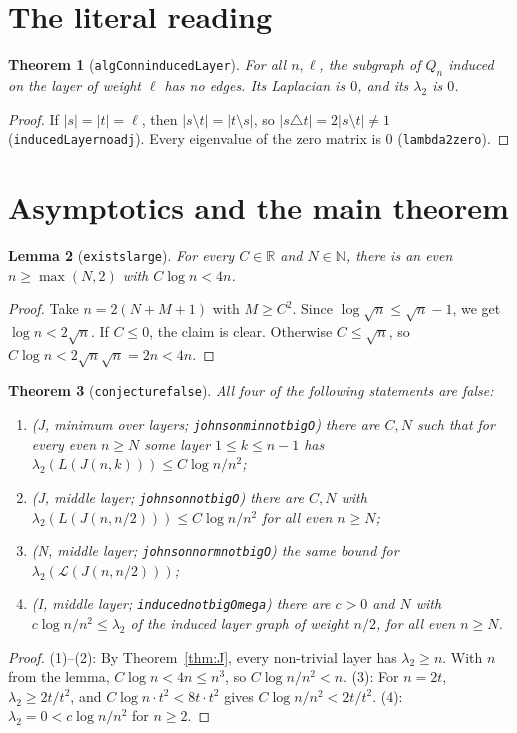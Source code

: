 \documentclass[11pt]{article}
\newtheorem{theorem}{Theorem}
\newtheorem{lemma}[theorem]{Lemma}
\theoremstyle{definition}
\theoremstyle{remark}
\renewcommand{\_}{\oldus\allowbreak}
\begin{document}
\section{The literal reading}

\begin{theorem}[\texttt{algConn\_inducedLayer}]
For all $n,\ell$, the subgraph of $Q_n$ induced on the layer of weight $\ell$ has no edges. Its Laplacian
is $0$, and its $\lambda_2$ is $0$.
\end{theorem}
\begin{proof}
If $|s|=|t|=\ell$, then $|s\setminus t|=|t\setminus s|$, so $|s\triangle t|=2|s\setminus t|\ne1$
(\texttt{inducedLayer\_no\_adj}). Every eigenvalue of the zero matrix is $0$ (\texttt{lambda2\_zero}).
\end{proof}

\section{Asymptotics and the main theorem}

\begin{lemma}[\texttt{exists\_large}]
For every $C\in\mathbb R$ and $N\in\mathbb N$, there is an even $n\ge\max(N,2)$ with $C\log n<4n$.
\end{lemma}
\begin{proof}
Take $n=2(N+M+1)$ with $M\ge C^2$. Since $\log\sqrt n\le\sqrt n-1$, we get $\log n<2\sqrt n$. If
$C\le0$, the claim is clear. Otherwise $C\le\sqrt n$, so $C\log n<2\sqrt n\sqrt n=2n<4n$.
\end{proof}

\begin{theorem}[\texttt{conjecture\_3963\_false}]
All four of the following statements are false:
\begin{enumerate}[leftmargin=*]
\item (J, minimum over layers; \texttt{johnson\_min\_not\_bigO}) there are $C,N$ such that for every even
  $n\ge N$ some layer $1\le k\le n-1$ has $\lambda_2(L(J(n,k)))\le C\log n/n^2$;
\item (J, middle layer; \texttt{johnson\_not\_bigO}) there are $C,N$ with
  $\lambda_2(L(J(n,n/2)))\le C\log n/n^2$ for all even $n\ge N$;
\item (N, middle layer; \texttt{johnson\_norm\_not\_bigO}) the same bound for $\lambda_2(\mathcal L(J(n,n/2)))$;
\item (I, middle layer; \texttt{induced\_not\_bigOmega}) there are $c>0$ and $N$ with
  $c\log n/n^2\le\lambda_2$ of the induced layer graph of weight $n/2$, for all even $n\ge N$.
\end{enumerate}
\end{theorem}
\begin{proof}
(1)--(2): By Theorem~\ref{thm:J}, every non-trivial layer has $\lambda_2\ge n$. With $n$ from the lemma,
$C\log n<4n\le n^3$, so $C\log n/n^2<n$. (3): For $n=2t$, $\lambda_2\ge 2t/t^2$, and
$C\log n\cdot t^2<8t\cdot t^2$ gives $C\log n/n^2<2t/t^2$. (4): $\lambda_2=0<c\log n/n^2$ for $n\ge2$.
\end{proof}
\end{document}
